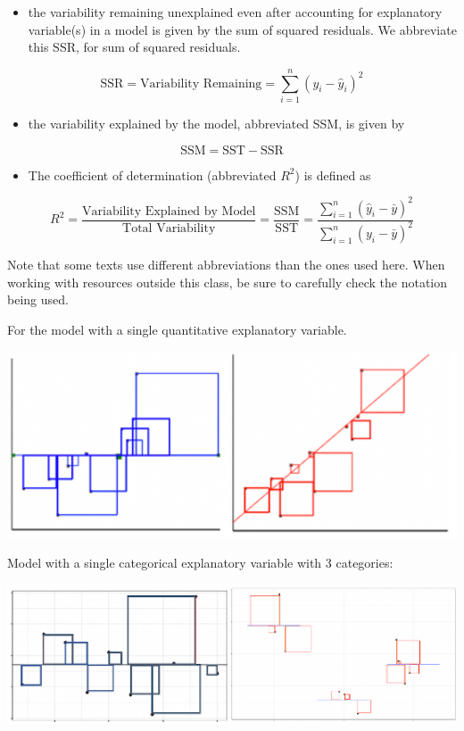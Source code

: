 \documentclass[
  letterpaper,
  DIV=11,
  numbers=noendperiod]{scrreprt}
\providecommand{\tightlist}{%
  \setlength{\itemsep}{0pt}\setlength{\parskip}{0pt}}\usepackage{longtable,booktabs,array}
\begin{document}
\begin{itemize}
\tightlist
\item
  the variability remaining unexplained even after accounting for
  explanatory variable(s) in a model is given by the sum of squared
  residuals. We abbreviate this SSR, for sum of squared residuals.
\end{itemize}

\[
\text{SSR} = \text{Variability Remaining}=\displaystyle\sum_{i=1}^n(y_i-\hat{y}_i)^2
\]

\begin{itemize}
\tightlist
\item
  the variability explained by the model, abbreviated SSM, is given by
\end{itemize}

\[ \text{SSM} = \text{SST} - \text{SSR} \]

\begin{itemize}
\tightlist
\item
  The coefficient of determination (abbreviated \(R^2\)) is defined as
\end{itemize}

\[R^2=\frac{\text{Variability Explained by Model}}{\text{Total Variability}}=\frac{\text{SSM}}{\text{SST}} =\frac{\displaystyle\sum_{i=1}^n(\hat{y}_i-\bar{y})^2}{\displaystyle\sum_{i=1}^n(y_i-\bar{y})^2}\]

Note that some texts use different abbreviations than the ones used
here. When working with resources outside this class, be sure to
carefully check the notation being used.

For the model with a single quantitative explanatory variable.

\includegraphics[width=1\textwidth,height=\textheight]{Rsq.png}

Model with a single categorical explanatory variable with 3 categories:

\includegraphics[width=1\textwidth,height=\textheight]{Rsq2.png}
\end{document}
